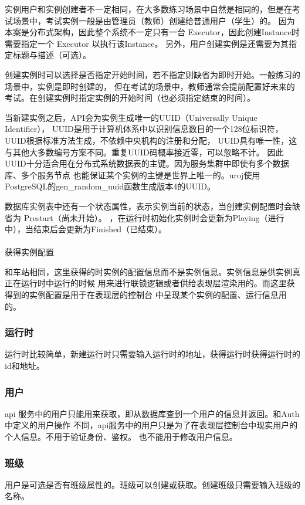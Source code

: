 实例用户和实例创建者不一定相同，在大多数练习场景中自然是相同的，但是在考试场景中，考试实例一般是由管理员（教师）创建给普通用户（学生）的。
因为本案是分布式架构，因此整个系统不一定只有一台 Executor，因此创建Instance时需要指定一个 Executor 以执行该Instance。
另外，用户创建实例是还需要为其指定标题与描述（可选）。

创建实例时可以选择是否指定开始时间，若不指定则缺省为即时开始。一般练习的场景中，实例是即时创建的，
但在考试的场景中，教师通常会提前配置好未来的考试。在创建实例时指定实例的开始时间（也必须指定结束的时间）。

当新建实例之后，API会为实例生成唯一的UUID（Universally Unique Identifier），
UUID是用于计算机体系中以识别信息数目的一个128位标识符，
UUID根据标准方法生成，不依赖中央机构的注册和分配，
UUID具有唯一性，这与其他大多数编号方案不同。重复UUID码概率接近零，可以忽略不计。
因此UUID十分适合用在分布式系统数据表的主键。因为服务集群中即使有多个数据库、多个服务节点
也能保证某个实例的主键是世界上唯一的。uroj使用PostgreSQL的gen\_random\_uuid函数生成版本4的UUID。

数据库实例表中还有一个状态属性，表示实例当前的状态，当创建实例配置时会缺省为 Prestart（尚未开始）。
，在运行时初始化实例时会更新为Playing（进行中），当结束后会更新为Finished（已结束）。

\paragraph{}获得实例配置

和车站相同，这里获得的时实例的配置信息而不是实例信息。实例信息是供实例真正在运行时中运行的时候
用来进行联锁逻辑或者供给表现层渲染用的。而这里获得到的实例配置是用于在表现层的控制台
中呈现某个实例的配置、运行信息用的。

\subsubsection{运行时}
运行时比较简单，新建运行时只需要输入运行时的地址，获得运行时获得运行时的id和地址。

\subsubsection{用户}
api 服务中的用户只能用来获取，即从数据库查到一个用户的信息并返回。和Auth中定义的用户操作
不同，api服务中的用户只是为了在表现层控制台中现实用户的个人信息。不用于验证身份、鉴权。
也不能用于修改用户信息。

\subsubsection{班级}
用户是可选是否有班级属性的。班级可以创建或获取。创建班级只需要输入班级的名称。
